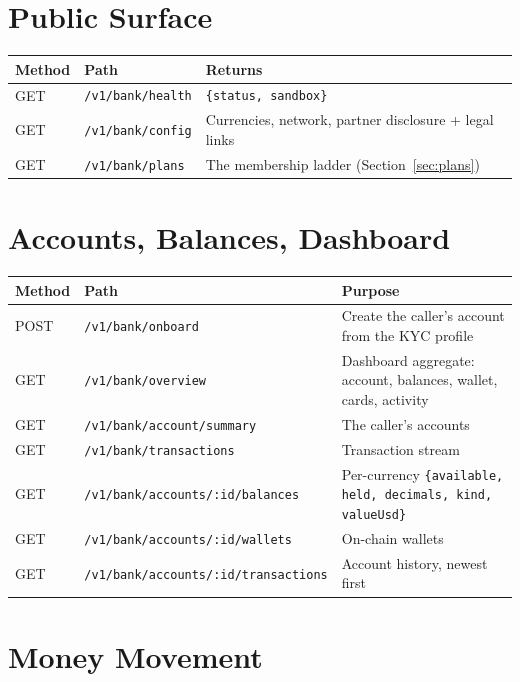 \documentclass[11pt]{article}
\newcommand{\ep}[1]{\texttt{\small #1}}
\begin{document}
\section{Public Surface}

\begin{table}[H]
\centering
\small
\begin{tabular}{@{}llp{7cm}@{}}
\toprule
\textbf{Method} & \textbf{Path} & \textbf{Returns} \\
\midrule
GET & \ep{/v1/bank/health} & \ep{\{status, sandbox\}} \\
GET & \ep{/v1/bank/config} & Currencies, network, partner disclosure + legal links \\
GET & \ep{/v1/bank/plans} & The membership ladder (Section~\ref{sec:plans}) \\
\bottomrule
\end{tabular}
\end{table}

\section{Accounts, Balances, Dashboard}

\begin{table}[H]
\centering
\small
\begin{tabular}{@{}llp{7cm}@{}}
\toprule
\textbf{Method} & \textbf{Path} & \textbf{Purpose} \\
\midrule
POST & \ep{/v1/bank/onboard} & Create the caller's account from the KYC profile \\
GET & \ep{/v1/bank/overview} & Dashboard aggregate: account, balances, wallet, cards, activity \\
GET & \ep{/v1/bank/account/summary} & The caller's accounts \\
GET & \ep{/v1/bank/transactions} & Transaction stream \\
GET & \ep{/v1/bank/accounts/:id/balances} & Per-currency \ep{\{available, held, decimals, kind, valueUsd\}} \\
GET & \ep{/v1/bank/accounts/:id/wallets} & On-chain wallets \\
GET & \ep{/v1/bank/accounts/:id/transactions} & Account history, newest first \\
\bottomrule
\end{tabular}
\end{table}

\section{Money Movement}
\end{document}

